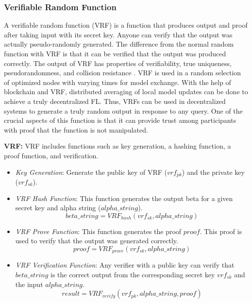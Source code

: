 \subsubsection{Verifiable Random Function} \label{vrf}
A verifiable random function (VRF) is a function that produces output
and proof after taking input with its secret key.
Anyone can verify that the output was actually pseudo-randomly generated.
The difference from the normal random function with VRF is that
it can be verified that the output was produced correctly.
The output of VRF has properties of verifiability, true uniqueness, pseudorandomness, and collision resistance
\cite{micali1999verifiable}.
VRF is used in a random selection of optimized nodes with varying times for model exchange.
With the help of blockchain and VRF, distributed averaging of
local model updates can be done to achieve a truly
decentralized FL.
Thus, VRFs can be used in decentralized systems to generate a truly random output in response to any query.
One of the crucial aspects of this function is that it can provide trust among participants with proof
that the function is not manipulated.


\noindent \textbf{VRF:} 
VRF includes functions such as key generation, a hashing function, a proof function, and verification.
\begin{itemize}
\item \textit{Key Generation}: Generate the public key of VRF ($vrf_{pk}$) and the private key ($vrf_{sk}$).
    \item \textit{VRF Hash Function}: This function generates the output beta for a given secret key and alpha string ($alpha\_string$).
     $$beta\_string = VRF_{hash}(vrf_{sk}, alpha\_string)$$
    \item \textit{VRF Prove Function}: This function generates the proof $proof$. 
    This proof is used to verify that the output was generated correctly.
    $$proof = VRF_{prove} (vrf_{sk}, alpha\_string)  $$
    \item \textit{VRF Verification Function}: Any verifier with a public key can verify that $beta\_string$ is the correct output from the corresponding secret key $vrf_{sk}$ and the input $alpha\_string$.
    $$result = VRF_{verify}(vrf_{pk}, alpha\_string, proof)$$
\end{itemize}

